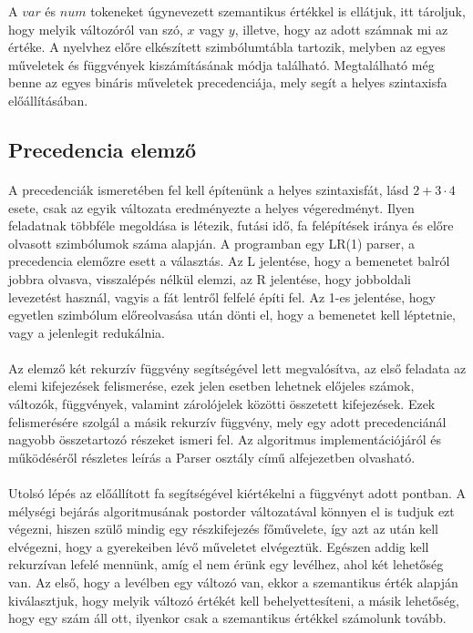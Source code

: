 \documentclass{elteikthesis}
\begin{document}
A $var$ és $num$ tokeneket úgynevezett szemantikus értékkel is ellátjuk, itt tároljuk, hogy melyik változóról van szó, $x$ vagy $y$, illetve, hogy az adott számnak mi az értéke. A nyelvhez előre elkészített szimbólumtábla tartozik, melyben az egyes műveletek és függvények kiszámításának módja található. Megtalálható még benne az egyes bináris műveletek precedenciája, mely segít a helyes szintaxisfa előállításában.
\subsection{Precedencia elemző}
\paragraph{}
A precedenciák ismeretében fel kell építenünk a helyes szintaxisfát, lásd $2+3\cdot4$ esete, csak az egyik változata eredményezte a helyes végeredményt. Ilyen feladatnak többféle megoldása is létezik, futási idő, fa felépítések iránya és előre olvasott szimbólumok száma alapján. A programban egy LR(1) parser, a precedencia elemőzre esett a választás. Az L jelentése, hogy a bemenetet balról jobbra olvasva, visszalépés nélkül elemzi, az R jelentése, hogy jobboldali levezetést használ, vagyis a fát lentről felfelé építi fel. Az 1-es jelentése, hogy egyetlen szimbólum előreolvasása után dönti el, hogy a bemenetet kell léptetnie, vagy a jelenlegit redukálnia.
\paragraph{}
Az elemző két rekurzív függvény segítségével lett megvalósítva, az első feladata az elemi kifejezések felismerése, ezek jelen esetben lehetnek előjeles számok, változók, függvények, valamint zárolójelek közötti összetett kifejezések. Ezek felismerésére szolgál a másik rekurzív függvény, mely egy adott precedenciánál nagyobb összetartozó részeket ismeri fel. Az algoritmus implementációjáról és működéséről részletes leírás a Parser osztály című alfejezetben olvasható.
\paragraph{}
Utolsó lépés az előállított fa segítségével kiértékelni a függvényt adott pontban. A mélységi bejárás algoritmusának postorder változatával könnyen el is tudjuk ezt végezni, hiszen szülő mindig egy részkifejezés főművelete, így azt az után kell elvégezni, hogy a gyerekeiben lévő műveletet elvégeztük. Egészen addig kell rekurzívan lefelé mennünk, amíg el nem érünk egy levélhez, ahol két lehetőség van. Az első, hogy a levélben egy változó van, ekkor a szemantikus érték alapján kiválasztjuk, hogy melyik változó értékét kell behelyettesíteni, a másik lehetőség, hogy egy szám áll ott, ilyenkor csak a szemantikus értékkel számolunk tovább.
\end{document}
